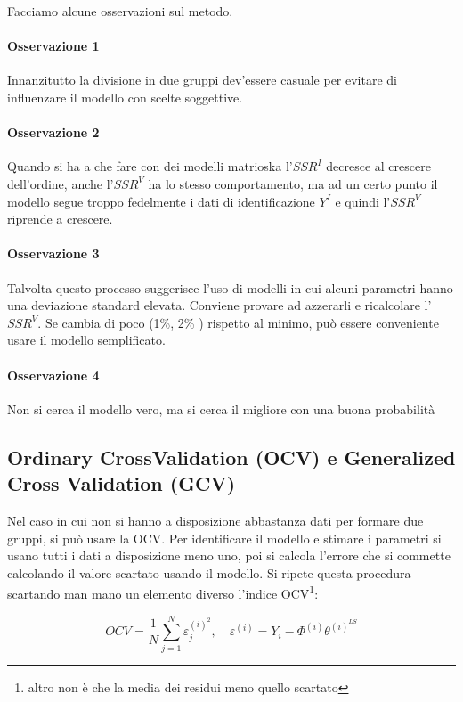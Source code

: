 Facciamo alcune osservazioni sul metodo. 
\paragraph{Osservazione 1} Innanzitutto la divisione in due gruppi dev'essere casuale per evitare di influenzare il modello con scelte soggettive.
\paragraph{Osservazione 2} Quando si ha a che fare con dei modelli matrioska l'$SSR^I$ decresce al crescere dell'ordine, anche l'$SSR^V$ ha lo stesso comportamento, ma ad un certo punto il modello segue troppo fedelmente i dati di identificazione $Y^I$ e quindi l'$SSR^V$ riprende a crescere.
\paragraph{Osservazione 3} Talvolta questo processo suggerisce l'uso di modelli in cui alcuni parametri hanno una deviazione standard elevata. Conviene provare ad azzerarli e ricalcolare l'$SSR^V$. Se cambia di poco (1\%, 2\% ) rispetto al minimo, può essere conveniente usare il modello semplificato.
\paragraph{Osservazione 4} Non si cerca il modello vero, ma si cerca il migliore con una buona probabilità
\subsection{Ordinary CrossValidation (OCV) e Generalized Cross Validation (GCV)}
Nel caso in cui non si hanno a disposizione abbastanza dati per formare due gruppi, si può usare la OCV. Per identificare il modello e stimare i parametri si usano tutti i dati a disposizione meno uno, poi si calcola l'errore che si commette calcolando il valore scartato usando il modello. Si ripete questa procedura scartando man mano un elemento diverso l'indice OCV\footnote{altro non è che la media dei residui meno quello scartato}:

    \[ OCV=\frac{1}{N}\sum_{j=1}^{N}{\varepsilon_j^{(i)^2}},  \quad    {\varepsilon^{(i)}}=Y_i-\Phi^{(i)}\theta^{(i)^{LS}} \]

